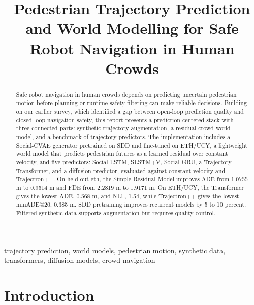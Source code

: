 \documentclass[conference]{IEEEtran}
\begin{document}
\title{Pedestrian Trajectory Prediction and World Modelling for Safe Robot Navigation in Human Crowds}

\author{
}
\maketitle

\begin{abstract}
Safe robot navigation in human crowds depends on predicting uncertain
pedestrian motion before planning or runtime safety filtering can make
reliable decisions. Building on our earlier survey, which identified a gap
between open-loop prediction quality and closed-loop navigation safety, this
report presents a prediction-centered stack with three connected parts:
synthetic trajectory augmentation, a residual crowd world model, and a
benchmark of trajectory predictors. The implementation includes a Social-CVAE generator
pretrained on SDD and fine-tuned on ETH/UCY, a lightweight world model that
predicts pedestrian futures as a learned residual over constant velocity, and
five predictors: Social-LSTM, SLSTM+V, Social-GRU, a Trajectory Transformer,
and a diffusion predictor, evaluated against constant velocity and
Trajectron++. On held-out eth, the Simple Residual Model improves ADE from
1.0755 m to 0.9514 m and FDE from 2.2819 m to 1.9171 m. On ETH/UCY, the
Transformer gives the lowest ADE, 0.568 m, and NLL, 1.54, while Trajectron++
gives the lowest minADE@20, 0.385 m. SDD pretraining improves recurrent models
by 5 to 10 percent. Filtered synthetic data supports augmentation but requires
quality control.
\end{abstract}

\begin{IEEEkeywords}
trajectory prediction, world models, pedestrian motion, synthetic data,
transformers, diffusion models, crowd navigation
\end{IEEEkeywords}

\section{Introduction}
\end{document}
